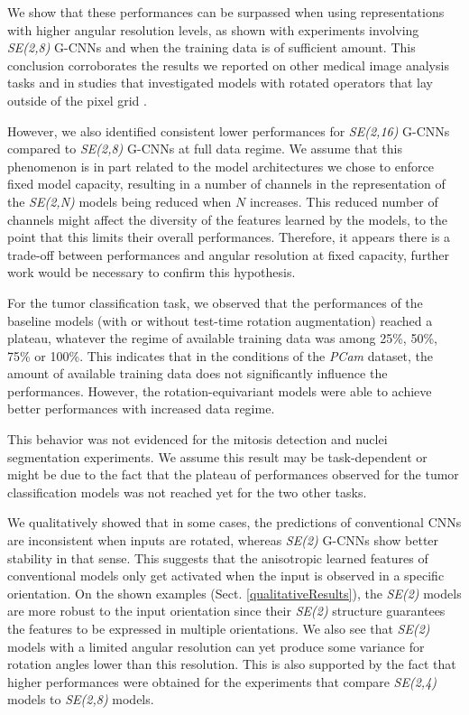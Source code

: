 \documentclass[twocolumn,final]{article}
\newcommand{\se}[1]{\textit{SE(#1)}}
\begin{document}
We show that these performances can be surpassed when using representations with higher angular resolution levels, as shown with experiments involving \se{2,8} G-CNNs and when the training data is of sufficient amount. This conclusion corroborates the results we reported on other medical image analysis tasks \citep{bekkers2018roto} and in studies that investigated models with rotated operators that lay outside of the pixel grid \citep{hoogeboom2018hexaconv}.

However, we also identified consistent lower performances for \se{2,16} G-CNNs compared to \se{2,8} G-CNNs at full data regime.
We assume that this phenomenon is in part related to the model architectures we chose to enforce fixed model capacity, resulting in a number of channels in the representation of the \se{2,N} models being reduced when $N$ increases. This reduced number of channels might affect the diversity of the features learned by the models, to the point that this limits their overall performances.
Therefore, it appears there is a trade-off between performances and angular resolution at fixed capacity, further work would be necessary to confirm this hypothesis.

For the tumor classification task, we observed that the performances of the baseline models (with or without test-time rotation augmentation) reached a plateau, whatever the regime of available training data was among 25\%, 50\%, 75\% or 100\%.
This indicates that in the conditions of the \textit{PCam} dataset, the amount of available training data does not significantly influence the performances.
However, the rotation-equivariant models were able to achieve better performances with increased data regime.

This behavior was not evidenced for the mitosis detection and nuclei segmentation experiments.
We assume this result may be task-dependent or might be due to the fact that the plateau of performances observed for the tumor classification models was not reached yet for the two other tasks.

We qualitatively showed that in some cases, the predictions of conventional CNNs are inconsistent when inputs are rotated, whereas \se{2} G-CNNs show better stability in that sense.
This suggests that the anisotropic learned features of conventional models only get activated when the input is observed in a specific orientation.
On the shown examples (Sect. \ref{qualitativeResults}), the \se{2} models are more robust to the input orientation since their \se{2} structure guarantees the features to be expressed in multiple orientations.
We also see that \se{2} models with a limited angular resolution can yet produce some variance for rotation angles lower than this resolution.
This is also supported by the fact that higher performances were obtained for the experiments that compare \se{2,4} models to \se{2,8} models.
\end{document}
